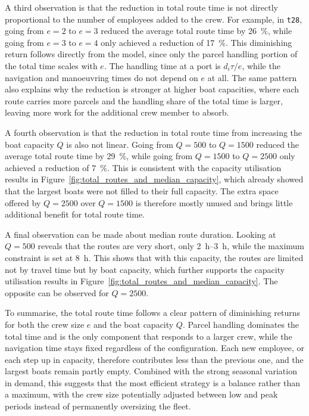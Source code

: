 \documentclass[12pt]{article}
\begin{document}
A third observation is that the reduction in total route time is not directly proportional to the number of employees added to the crew. For example, in \texttt{t28}, going from \(e=2\) to \(e=3\) reduced the average total route time by \qty{26}{\percent}, while going from \(e=3\) to \(e=4\) only achieved a reduction of \qty{17}{\percent}. This diminishing return follows directly from the model, since only the parcel handling portion of the total time scales with \(e\). The handling time at a port is \(d_i \tau / e\), while the navigation and manoeuvring times do not depend on \(e\) at all. The same pattern also explains why the reduction is stronger at higher boat capacities, where each route carries more parcels and the handling share of the total time is larger, leaving more work for the additional crew member to absorb.

A fourth observation is that the reduction in total route time from increasing the boat capacity \(Q\) is also not linear. Going from \(Q=500\) to \(Q=1500\) reduced the average total route time by \qty{29}{\percent}, while going from \(Q=1500\) to \(Q=2500\) only achieved a reduction of \qty{7}{\percent}. This is consistent with the capacity utilisation results in Figure~\ref{fig:total_routes_and_median_capacity}, which already showed that the largest boats were not filled to their full capacity. The extra space offered by \(Q=2500\) over \(Q=1500\) is therefore mostly unused and brings little additional benefit for total route time.

A final observation can be made about median route duration. Looking at \(Q=500\) reveals that the routes are very short, only \qtyrange{2}{3}{\hour}, while the maximum constraint is set at \qty{8}{\hour}. This shows that with this capacity, the routes are limited not by travel time but by boat capacity, which further supports the capacity utilisation results in Figure~\ref{fig:total_routes_and_median_capacity}. The opposite can be observed for \(Q=2500\).

To summarise, the total route time follows a clear pattern of diminishing returns for both the crew size \(e\) and the boat capacity \(Q\). Parcel handling dominates the total time and is the only component that responds to a larger crew, while the navigation time stays fixed regardless of the configuration. Each new employee, or each step up in capacity, therefore contributes less than the previous one, and the largest boats remain partly empty. Combined with the strong seasonal variation in demand, this suggests that the most efficient strategy is a balance rather than a maximum, with the crew size potentially adjusted between low and peak periods instead of permanently oversizing the fleet.
\end{document}
